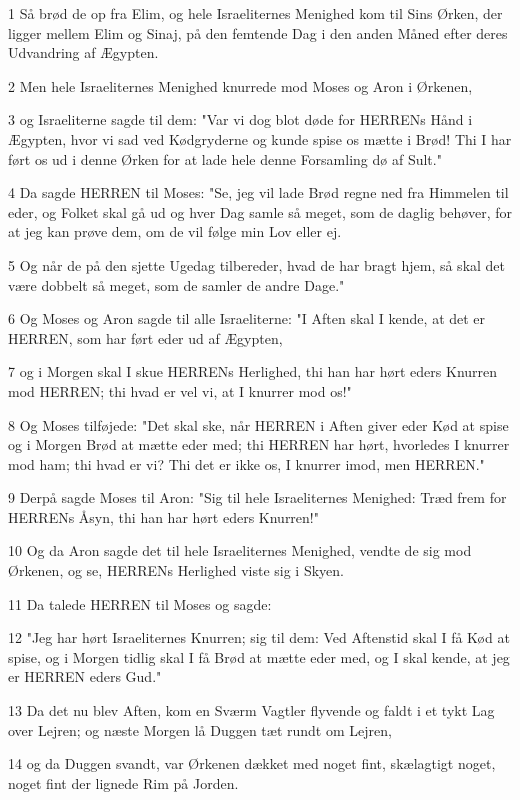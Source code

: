 \par 1 Så brød de op fra Elim, og hele Israeliternes Menighed kom til Sins Ørken, der ligger mellem Elim og Sinaj, på den femtende Dag i den anden Måned efter deres Udvandring af Ægypten.
\par 2 Men hele Israeliternes Menighed knurrede mod Moses og Aron i Ørkenen,
\par 3 og Israeliterne sagde til dem: "Var vi dog blot døde for HERRENs Hånd i Ægypten, hvor vi sad ved Kødgryderne og kunde spise os mætte i Brød! Thi I har ført os ud i denne Ørken for at lade hele denne Forsamling dø af Sult."
\par 4 Da sagde HERREN til Moses: "Se, jeg vil lade Brød regne ned fra Himmelen til eder, og Folket skal gå ud og hver Dag samle så meget, som de daglig behøver, for at jeg kan prøve dem, om de vil følge min Lov eller ej.
\par 5 Og når de på den sjette Ugedag tilbereder, hvad de har bragt hjem, så skal det være dobbelt så meget, som de samler de andre Dage."
\par 6 Og Moses og Aron sagde til alle Israeliterne: "I Aften skal I kende, at det er HERREN, som har ført eder ud af Ægypten,
\par 7 og i Morgen skal I skue HERRENs Herlighed, thi han har hørt eders Knurren mod HERREN; thi hvad er vel vi, at I knurrer mod os!"
\par 8 Og Moses tilføjede: "Det skal ske, når HERREN i Aften giver eder Kød at spise og i Morgen Brød at mætte eder med; thi HERREN har hørt, hvorledes I knurrer mod ham; thi hvad er vi? Thi det er ikke os, I knurrer imod, men HERREN."
\par 9 Derpå sagde Moses til Aron: "Sig til hele Israeliternes Menighed: Træd frem for HERRENs Åsyn, thi han har hørt eders Knurren!"
\par 10 Og da Aron sagde det til hele Israeliternes Menighed, vendte de sig mod Ørkenen, og se, HERRENs Herlighed viste sig i Skyen.
\par 11 Da talede HERREN til Moses og sagde:
\par 12 "Jeg har hørt Israeliternes Knurren; sig til dem: Ved Aftenstid skal I få Kød at spise, og i Morgen tidlig skal I få Brød at mætte eder med, og I skal kende, at jeg er HERREN eders Gud."
\par 13 Da det nu blev Aften, kom en Sværm Vagtler flyvende og faldt i et tykt Lag over Lejren; og næste Morgen lå Duggen tæt rundt om Lejren,
\par 14 og da Duggen svandt, var Ørkenen dækket med noget fint, skælagtigt noget, noget fint der lignede Rim på Jorden.
